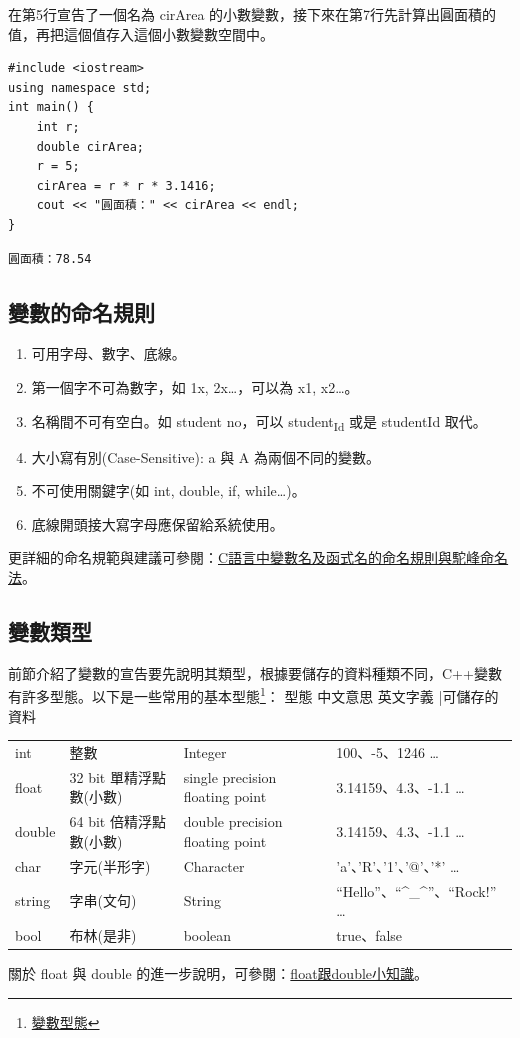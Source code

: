 \documentclass[12pt,a4paper]{article}
\begin{document}
在第5行宣告了一個名為 cirArea 的小數變數，接下來在第7行先計算出圓面積的值，再把這個值存入這個小數變數空間中。
\lstset{breaklines=true,language=C++,label= ,caption= ,captionpos=b,firstnumber=1,numbers=left}
\begin{lstlisting}
#include <iostream>
using namespace std;
int main() {
    int r;
    double cirArea;
    r = 5;
    cirArea = r * r * 3.1416;
    cout << "圓面積：" << cirArea << endl;
}
\end{lstlisting}

\begin{verbatim}
圓面積：78.54
\end{verbatim}

\subsection{變數的命名規則}
\label{sec:org0fd607b}
\begin{enumerate}
\item 可用字母、數字、底線。
\item 第一個字不可為數字，如 1x, 2x\ldots{}，可以為 x1, x2\ldots{}。
\item 名稱間不可有空白。如 student no，可以 student\textsubscript{Id} 或是 studentId 取代。
\item 大小寫有別(Case-Sensitive): a 與 A 為兩個不同的變數。
\item 不可使用關鍵字(如 int, double, if, while\ldots{})。
\item 底線開頭接大寫字母應保留給系統使用。
\end{enumerate}
更詳細的命名規範與建議可參閱：\href{https://www.itread01.com/content/1541214186.html}{C語言中變數名及函式名的命名規則與駝峰命名法}。

\subsection{變數類型}
\label{cpp_variable_types}
前節介紹了變數的宣告要先說明其類型，根據要儲存的資料種類不同，C++變數有許多型態。以下是一些常用的基本型態\footnote{\href{https://www.csie.ntu.edu.tw/\~b98902112/cpp\_and\_algo/cpp/variable\_type\_and\_declare.html}{變數型態}}：
型態 	中文意思 	英文字義 |可儲存的資料
\begin{center}
\begin{tabular}{llll}
int & 整數 & Integer & 100、-5、1246 \ldots{}\\
float & 32 bit 單精浮點數(小數) & single precision floating point & 3.14159、4.3、-1.1 \ldots{}\\
double & 64 bit 倍精浮點數(小數) & double precision floating point & 3.14159、4.3、-1.1 \ldots{}\\
char & 字元(半形字) & Character & 'a'、'R'、'1'、'@'、'*' \ldots{}\\
string & 字串(文句) & String & ``Hello''、``\^{}\_\^{}''、``Rock!'' \ldots{}\\
bool & 布林(是非) & boolean & true、false\\
\end{tabular}
\end{center}
關於 float 與 double 的進一步說明，可參閱：\href{https://taichunmin.pixnet.net/blog/post/27827769}{float跟double小知識}。
\end{document}
